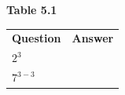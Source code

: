 {{\begin{center}
\begin{tabular}[t]{|l|l|}
     \tabularnewline\cline{1-1}\cline{2-2}
    \end{tabular}
      \end{center}
    \begin{center}{\small\bfseries Table 5.1}\end{center}
          }{ %
        \begin{center}
      \label{m38359*id67604}
    \noindent
      \tablelasttail{}
      \begin{xtabular}[t]{|l|l|}\hline
                  \textbf{Question}
                 &
                  \textbf{Answer}
     \tabularnewline{}
                  \begin{math}{2}^{3}\end{math}
                 &
     \tabularnewline{}
                  \begin{math}{7}^{3-3}\end{math}

\end{xtabular}
\end{center}}}
